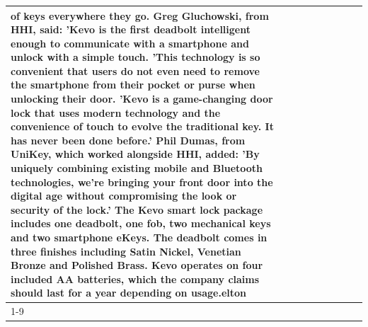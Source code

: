 \begin{table}[H]
\begin{tabular}{lllrlllll}
of keys everywhere they go. Greg Gluchowski, from HHI, said: 'Kevo is the first deadbolt intelligent enough to communicate with a smartphone and unlock with a simple touch. 'This technology is so convenient that users do not even need to remove the smartphone from their pocket or purse when unlocking their door. 'Kevo is a game-changing door lock that uses modern technology and the convenience of touch to evolve the traditional key. It has never been done before.' Phil Dumas, from UniKey, which worked alongside HHI, added: 'By uniquely combining existing mobile and Bluetooth technologies, we’re bringing your front door into the digital age without compromising the look or security of the lock.' The Kevo smart lock package includes one deadbolt, one fob, two mechanical keys and two smartphone eKeys. The deadbolt comes in three finishes including Satin Nickel, Venetian Bronze and Polished Brass. Kevo operates on four included AA batteries, which the company claims should last for a year depending on usage.elton \\
\cline{1-9}

\end{tabular}
\end{table}
